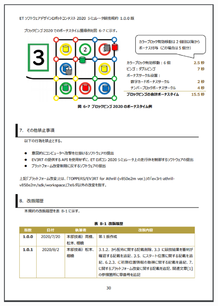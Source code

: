 \documentclass[uplatex, report, a4j, 10pt]{jsbook}
\begin{document}
\begin{figure}[tp]
    \begin{center}
    \includegraphics[width=\hsize]{specification/ET_17.eps}
    \end{center}
\end{figure}


\end{document}
